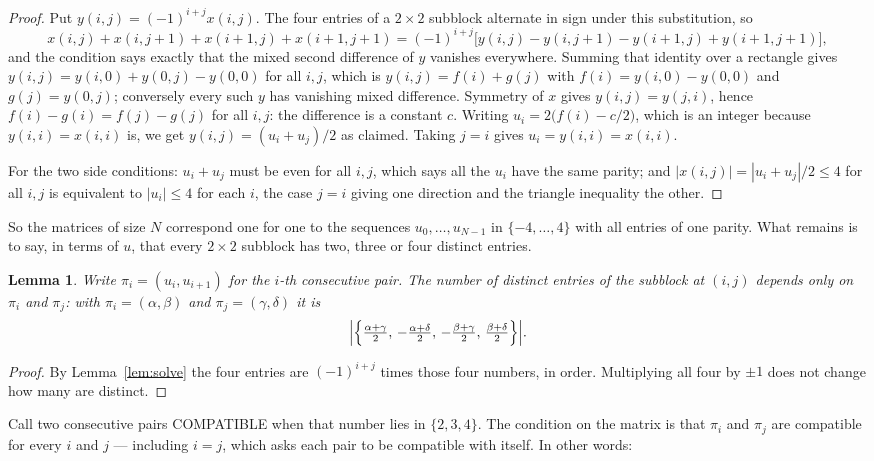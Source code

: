 \documentclass[11pt,a4paper]{article}
\theoremstyle{plain}
\newtheorem{lemma}[theorem]{Lemma}
\theoremstyle{definition}
\begin{document}
\begin{proof}
Put $y(i,j)=(-1)^{i+j}x(i,j)$. The four entries of a $2\times2$ subblock alternate in sign
under this substitution, so
\[
x(i,j)+x(i,j{+}1)+x(i{+}1,j)+x(i{+}1,j{+}1)
=(-1)^{i+j}\bigl[y(i,j)-y(i,j{+}1)-y(i{+}1,j)+y(i{+}1,j{+}1)\bigr],
\]
and the condition says exactly that the mixed second difference of $y$ vanishes everywhere.
Summing that identity over a rectangle gives
$y(i,j)=y(i,0)+y(0,j)-y(0,0)$ for all $i,j$, which is $y(i,j)=f(i)+g(j)$ with
$f(i)=y(i,0)-y(0,0)$ and $g(j)=y(0,j)$; conversely every such $y$ has vanishing mixed
difference. Symmetry of $x$ gives $y(i,j)=y(j,i)$, hence $f(i)-g(i)=f(j)-g(j)$ for all $i,j$:
the difference is a constant $c$. Writing $u_i=2\bigl(f(i)-c/2\bigr)$, which is an integer
because $y(i,i)=x(i,i)$ is, we get $y(i,j)=(u_i+u_j)/2$ as claimed. Taking $j=i$ gives
$u_i=y(i,i)=x(i,i)$.

For the two side conditions: $u_i+u_j$ must be even for all $i,j$, which says all the $u_i$ have
the same parity; and $|x(i,j)|=|u_i+u_j|/2\le4$ for all $i,j$ is equivalent to $|u_i|\le4$
for each $i$, the case $j=i$ giving one direction and the triangle inequality the other.
\end{proof}

So the matrices of size $N$ correspond one for one to the sequences $u_0,\dots,u_{N-1}$ in
$\{-4,\dots,4\}$ with all entries of one parity. What remains is to say, in terms of $u$,
that every $2\times2$ subblock has two, three or four distinct entries.

\begin{lemma}\label{lem:block}
Write $\pi_i=(u_i,u_{i+1})$ for the $i$-th consecutive pair. The number of distinct entries of
the subblock at $(i,j)$ depends only on $\pi_i$ and $\pi_j$: with $\pi_i=(\alpha,\beta)$ and
$\pi_j=(\gamma,\delta)$ it is
\[
\Bigl|\Bigl\{\tfrac{\alpha+\gamma}{2},\,-\tfrac{\alpha+\delta}{2},\,
-\tfrac{\beta+\gamma}{2},\,\tfrac{\beta+\delta}{2}\Bigr\}\Bigr| .
\]
\end{lemma}

\begin{proof}
By Lemma~\ref{lem:solve} the four entries are $(-1)^{i+j}$ times those four numbers, in
order. Multiplying all four by $\pm1$ does not change how many are distinct.
\end{proof}

Call two consecutive pairs COMPATIBLE when that number lies in $\{2,3,4\}$. The condition on the
matrix is that $\pi_i$ and $\pi_j$ are compatible for every $i$ and $j$ --- including $i=j$,
which asks each pair to be compatible with itself. In other words:
\end{document}
